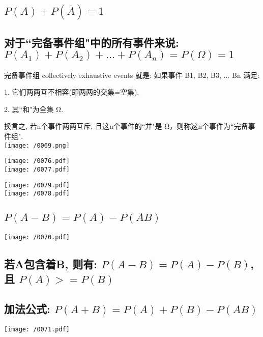 \documentclass[UTF8]{ctexart}
\begin{document}
	\subsection{$P(A) + P(\overline{A}) = 1$}
	
	\subsection{对于``完备事件组"中的所有事件来说: $P(A_1) + P(A_2) + ... +  P(A_n) =  P(\Omega) = 1$}
	
	完备事件组 collectively exhaustive events 就是: 如果事件 B1, B2, B3, ...  Bn 满足:
	
	1. 它们两两互不相容(即两两的交集=空集),
	
	2. 其``和"为全集 Ω. 	
	
	换言之, 若n个事件两两互斥, 且这n个事件的``并"是 Ω，则称这n个事件为``完备事件组". \\
	
	\texttt{[image: /0069.png]}
	
	
	\begin{myEnvSample}
\texttt{[image: /0076.pdf]} \\

\texttt{[image: /0077.pdf]}
	\end{myEnvSample}
	
	
	\begin{myEnvSample}
	\texttt{[image: /0079.pdf]} \\
		
\texttt{[image: /0078.pdf]} 
	\end{myEnvSample}
	
	
	
	\subsection{$P(A-B) = P(A) - P(AB)$}	
		\texttt{[image: /0070.pdf]}
		
	
	\subsection{若A包含着B, 则有: $ P(A-B) = P(A) - P(B)$, 且 $P(A) >= P(B) $}
	
	
	\subsection{加法公式: $ P(A+B) = P(A) + P(B) - P(AB)$}	
	\texttt{[image: /0071.pdf]} \\
	
\end{document}
